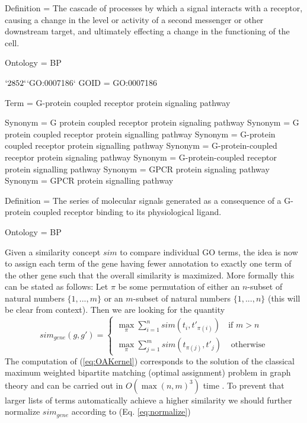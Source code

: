 \documentclass[12pt,a4paper]{article}
\begin{document}
\begin{Schunk}
\begin{Soutput}
Definition = The cascade of processes by which a signal interacts with
     a receptor, causing a change in the level or activity of a second
     messenger or other downstream target, and ultimately effecting a
     change in the functioning of the cell.

Ontology = BP


$`2852`$`GO:0007186`
GOID = GO:0007186

Term = G-protein coupled receptor protein signaling pathway

Synonym = G protein coupled receptor protein signaling pathway
Synonym = G protein coupled receptor protein signalling pathway
Synonym = G-protein coupled receptor protein signalling pathway
Synonym = G-protein-coupled receptor protein signaling pathway
Synonym = G-protein-coupled receptor protein signalling pathway
Synonym = GPCR protein signaling pathway
Synonym = GPCR protein signalling pathway

Definition = The series of molecular signals generated as a consequence
     of a G-protein coupled receptor binding to its physiological
     ligand.

Ontology = BP
\end{Soutput}
\end{Schunk}
Given a similarity concept $sim$ to compare individual GO terms, the idea is now to assign each term of the gene having fewer annotation to exactly one term of the other gene such that the overall similarity is maximized. More formally this can be stated as follows: Let $\pi$ be some permutation of either an $n$-subset of natural numbers
$\{1,...,m\}$ or an $m$-subset of natural numbers $\{1,...,n\}$ (this will
be clear from context). Then we are looking for the quantity
\begin{equation}
sim_{gene}(g,g')=\left\{ \begin{array}{cc}
\max_{\pi}\sum_{i=1}^{n}sim(t_{i},t'_{\pi(i)}) & \textrm{if }m>n\\
\max_{\pi}\sum_{j=1}^{m}sim(t_{\pi(j)},t'_{j}) & \textrm{ otherwise}
\end{array}\right.\label{eq:OAKernel}
\end{equation}
The computation of (\ref{eq:OAKernel}) corresponds to the solution
of the classical maximum weighted bipartite matching (optimal assignment)
problem in graph theory and can be carried out in $O(\max(n,m)^{3})$
time \cite{LEDABook99}. To prevent that larger lists of terms automatically
achieve a higher similarity we should further normalize $sim_{gene}$ according to (Eq. \ref{eq:normalize})
\end{document}
